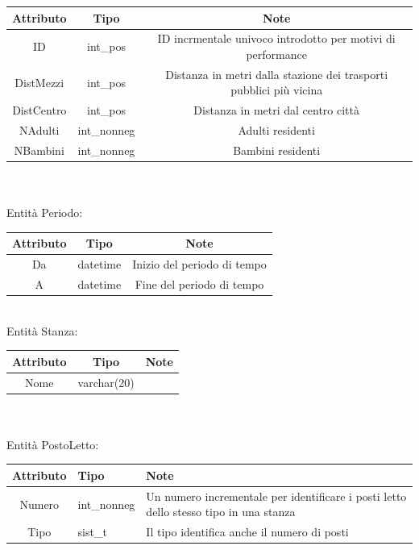 \documentclass[a4paper,12pt]{report}
\begin{document}
      \begin{tabular}{|c|c|c|}
        \hline Attributo & Tipo & Note \\
        \hline ID & int\_pos & ID incrmentale univoco introdotto per motivi di performance \\
        \hline DistMezzi & int\_pos & Distanza in metri dalla stazione dei trasporti pubblici più vicina \\
        \hline DistCentro & int\_pos & Distanza in metri dal centro città \\
        \hline NAdulti & int\_nonneg & Adulti residenti \\
        \hline NBambini & int\_nonneg & Bambini residenti \\
        \hline
      \end{tabular} \\
      \vspace{24pt} \\
      Entità Periodo: \\
      \begin{tabular}{|c|c|c|}
        \hline Attributo & Tipo & Note \\
        \hline Da & datetime & Inizio del periodo di tempo \\
        \hline A & datetime & Fine del periodo di tempo \\
        \hline
      \end{tabular} \\
      \newpage
      Entità Stanza: \\
      \begin{tabular}{|c|c|c|}
        \hline Attributo & Tipo & Note \\
        \hline Nome & varchar(20) & \\
        \hline
      \end{tabular} \\
      \vspace{24pt} \\
      Entità PostoLetto: \\
      \begin{tabular}{|c|p{}|p{}|}
        \hline Attributo & Tipo & Note \\
        \hline Numero & int\_nonneg & Un numero incrementale per identificare i posti letto dello stesso tipo in una stanza \\
        \hline Tipo & sist\_t & Il tipo identifica anche il numero di posti \\
        \hline
      \end{tabular} \\
\end{document}

